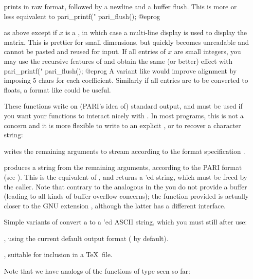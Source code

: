  prints  in raw format, followed by a
newline and a buffer flush. This is more or less equivalent to
\bprog
    pari_printf("%
    pari_flush();
@eprog

 as above except if $x$ is a , in which
case a multi-line display is used to display the matrix. This is prettier for
small dimensions, but quickly becomes unreadable and cannot be pasted and
reused for input. If all entries of $x$ are small integers, you may use the
recursive features of  and obtain the same (or better) effect with
\bprog
    pari_printf("%
    pari_flush();
@eprog\noindent
A variant like  would improve alignment by imposing
5 chars for each coefficient. Similarly if all entries are to be converted to
floats, a format like  could be useful.


These functions write on (PARI's idea of) standard output, and must be used
if you want your functions to interact nicely with . In most
programs, this is not a concern and it is more flexible to write to an
explicit , or to recover a character string:

 writes the
remaining arguments to stream  according to the format
specification .

 produces a string from the
remaining arguments, according to the PARI format  (see ).
This is the  equivalent of , and returns a
'ed string, which must be freed by the caller. Note that contrary
to the analogous  in the  you do not provide a buffer
(leading to all kinds of buffer overflow concerns); the function provided is
actually closer to the GNU extension , although the latter has
a different interface.

Simple variants of  convert a  to a
'ed ASCII string, which you must still  after use:

, using the current default output format
( by default).

, suitable for inclusion in a \TeX\ file.


Note that we have  analogs of the functions of  type
seen so far:

